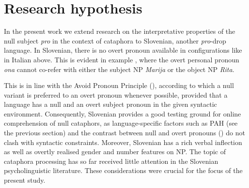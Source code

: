 \documentclass[output=paper,colorlinks,citecolor=brown]{langscibook}
\begin{document}
\section{Research hypothesis}\label{ste-pav:sec:research-hypothesis}

In the present work we extend research on the interpretative properties of the null subject \textit{pro} in the context of cataphora to Slovenian, another \textit{pro}-drop language. In Slovenian, there is no overt pronoun available in configurations like in Italian  above. This is evident in example , where the overt personal pronoun \textit{ona} cannot co-refer with either the subject NP \textit{Marija} or the object NP \textit{Rita}.

\ea \label{ste-pav:ex:ko-pripoveduje}
 \label{ste-pav:ex:ko-pripoveduje-a}
 \label{ste-pav:ex:ko-pripoveduje-b}
\z
\z

\noindent This is in line with the Avoid Pronoun Principle (\citealt{chomsky1981}), according to which a null variant is preferred to an overt pronoun whenever possible, provided that a language has a null and an overt subject pronoun in the given syntactic environment. Consequently, Slovenian provides a good testing ground for online comprehension of null cataphors, as language-specific factors such as PAH (see the previous section) and the contrast between null and overt pronouns (\citealt{boschEtal2003, wilsonKeller2009}) do not clash with syntactic constraints. Moreover, Slovenian has a rich verbal inflection as well as overtly realised gender and number features on NP. The topic of cataphora processing has so far received little attention in the Slovenian psycholinguistic literature. These considerations were crucial for the focus of the present study.
\end{document}

